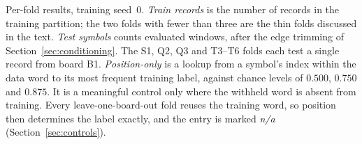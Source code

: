 \documentclass{ieeeaccess}
\begin{document}
\begin{table}[!t]
\caption{Per-fold results, training seed~0. \emph{Train records} is the number
of records in the training partition; the two folds with fewer than three are
the thin folds discussed in the text. \emph{Test symbols} counts evaluated
windows, after the edge trimming of Section~\ref{sec:conditioning}. The S1,
Q2, Q3 and T3--T6 folds each test a single record from board B1.
\emph{Position-only} is a lookup from a symbol's index within the data word to
its most frequent training label, against chance levels of $0.500$, $0.750$
and $0.875$. It is a meaningful control only where the withheld word is absent
from training. Every leave-one-board-out fold reuses the training word, so
position then determines the label exactly, and the entry is marked
\textit{n/a} (Section~\ref{sec:controls}).
}


\end{table}
\end{document}
